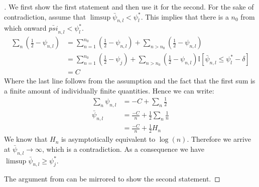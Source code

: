 \begin{proof}[]
    We first show the first statement and then use it for the second. For the
    sake of contradiction, assume that $\limsup \bar{\psi}_{n, l} <
    \psi_l^*$. This implies that there is a $n_0$ from which onward
    $\bar{psi}_{n, l} < \psi_l^*$.
    \begin{align}
      \sum_n (\frac{1}{2} - \psi_{n, l}) &= \sum_{n=1}^{n_0} (\frac{1}{2} -
            \psi_{n, l}) + \sum_{n > n_0} (\frac{1}{2} - \psi_{n, l}) \\
        &= \sum_{n=1}^{n_0} (\frac{1}{2} - \psi_j) + \sum_{n > n_0}
            (\frac{1}{2} - \psi_{n, l})\mathbb{I}[\bar{\psi}_{n, l} \leq
            \psi_l^* - \delta] \\
        &= C
    \end{align}
    Where the last line follows from the assumption and the fact that the first
    sum is a finite amount of individually finite quantities. Hence we can
    write:
    \begin{align}
      \sum_n \psi_{n, l} &= -C + \sum_n \frac{1}{2} \\
      \bar{\psi}_{n, l} &= \frac{-C}{n} + \frac{1}{2}\sum_n\frac{1}{n} \\
        &= \frac{-C}{n} + \frac{1}{2} H_n
    \end{align}
    We know that $H_n$ is asymptotically equivalent to $\log(n)$. Therefore we
    arrive at $\bar{\psi}_{n, l} \rightarrow \infty$, which is a contradiction.
    As a consequence we have $\limsup \bar{\psi}_{n, l} \geq \psi_j^*$.

    The argument from  can be
    mirrored to show the second statement.
  \end{proof}

